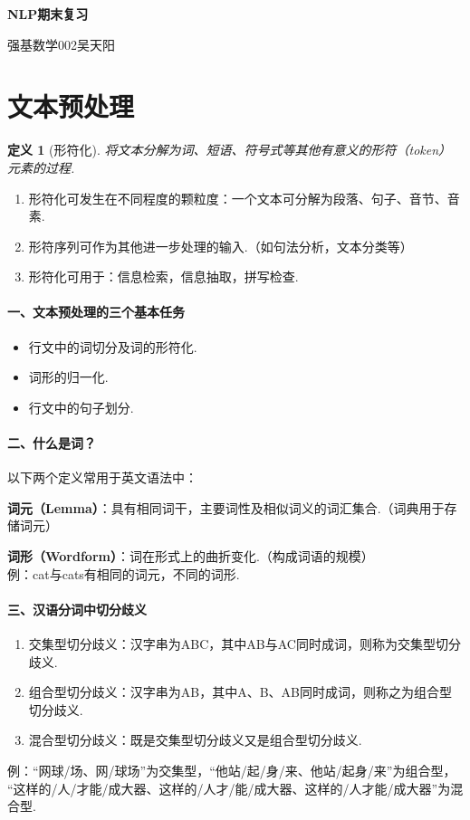 \documentclass[12pt, a4paper, oneside]{ctexart}
\newtheorem{definition}{定义}
\numberwithin{equation}{section}  %
\newenvironment{myTitle}[1]{
    \begin{center}
    {\zihao{-2}\bf #1\\}
    \zihao{-4}\it
}{\end{center}}  %
\newenvironment{remark}{\begin{enumerate}[label=\textbf{注\arabic*.}]}{\end{enumerate}}
\begin{document}
\clearpage
\begin{myTitle}{NLP期末复习}
    强基数学002\quad 吴天阳
\end{myTitle}
\section{文本预处理}
\begin{definition}[形符化]
    将文本分解为词、短语、符号式等其他有意义的形符（token）元素的过程.
\end{definition}
\begin{remark}
    \item 形符化可发生在不同程度的颗粒度：一个文本可分解为段落、句子、音节、音素.
    \item 形符序列可作为其他进一步处理的输入.（如句法分析，文本分类等）
    \item 形符化可用于：信息检索，信息抽取，拼写检查.
\end{remark}

\paragraph{一、文本预处理的三个基本任务}
\begin{itemize}
    \item 行文中的词切分及词的形符化.
    \item 词形的归一化.
    \item 行文中的句子划分.
\end{itemize}

\paragraph{二、什么是词？}以下两个定义常用于英文语法中：

\textbf{词元（Lemma）}：具有相同词干，主要词性及相似词义的词汇集合.（词典用于存储词元）

\textbf{词形（Wordform）}：词在形式上的曲折变化.（构成词语的规模）\\
例：cat与cats有相同的词元，不同的词形.

\paragraph{三、汉语分词中切分歧义}
\begin{enumerate}
    \item 交集型切分歧义：汉字串为ABC，其中AB与AC同时成词，则称为交集型切分歧义.
    \item 组合型切分歧义：汉字串为AB，其中A、B、AB同时成词，则称之为组合型切分歧义.
    \item 混合型切分歧义：既是交集型切分歧义又是组合型切分歧义.
\end{enumerate}
\noindent 例：“网球/场、网/球场”为交集型，“他站/起/身/来、他站/起身/来”为组合型，
“这样的/人/才能/成大器、这样的/人才/能/成大器、这样的/人才能/成大器”为混合型.
\end{document}
